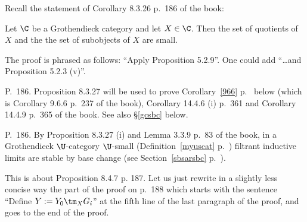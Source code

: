 \documentclass[12pt]{article}
\theoremstyle{remark}
\theoremstyle{definition}
\begin{document}
%

\begin{s}%
Recall the statement of Corollary 8.3.26 p.~186 of the book:

Let $\C$ be a Grothendieck category and let $X\in\C$. Then the set of quotients of $X$ and the the set of subobjects of $X$ are small. 

The proof is phrased as follows: ``Apply Proposition 5.2.9''. One could add ``\dots and Proposition 5.2.3 (v)''.
\end{s}

%

\begin{s}
P.~186. Proposition 8.3.27 will be used to prove Corollary~\ref{966} p.~ below (which is Corollary 9.6.6 p.~237 of the book), Corollary 14.4.6 (i) p.~361 and Corollary 14.4.9 p.~365 of the book. See also \S\ref{gcsbc} below.
\end{s}

%

\begin{s}
P.~186. By Proposition 8.3.27 (i) and Lemma 3.3.9 p.~83 of the book, in a Grothendieck $\U$-category $\U$-small (Definition~\ref{myuscat} p.~) filtrant inductive limits are stable by base change (see Section~\ref{sbsarsbc} p.~).
\end{s}



This is about Proposition 8.4.7 p. 187. Let us just rewrite in a slightly less concise way the part of the proof on p.~188 which starts with the sentence ``Define $Y:=Y_0\tm_XG_i$'' at the fifth line of the last paragraph of the proof, and goes to the end of the proof. 
\end{document}
